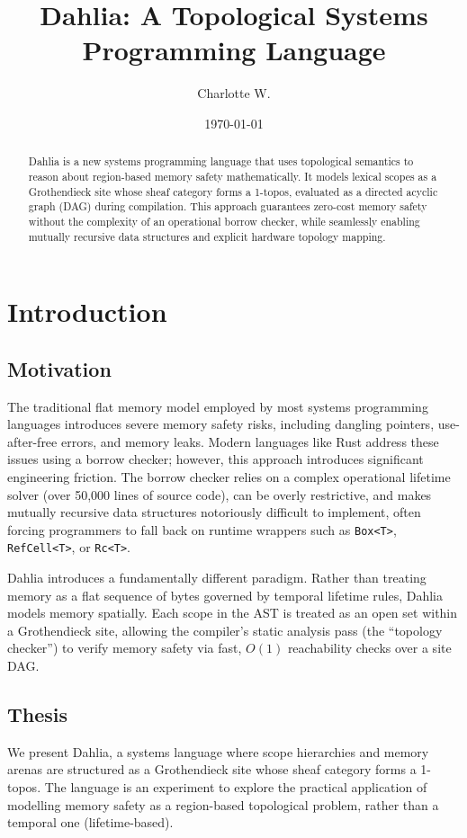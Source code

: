 \documentclass[11pt]{article}
\title{Dahlia: A Topological Systems Programming Language}
\author{Charlotte W.}
\date{\today}
\begin{document}
\maketitle
\begin{abstract}
    Dahlia is a new systems programming language that uses topological semantics to reason about region-based memory safety mathematically. It models lexical scopes as a Grothendieck site whose sheaf category forms a 1-topos, evaluated as a directed acyclic graph (DAG) during compilation. This approach guarantees zero-cost memory safety without the complexity of an operational borrow checker, while seamlessly enabling mutually recursive data structures and explicit hardware topology mapping.
\end{abstract}

\tableofcontents

\pagebreak

\section{Introduction}

\subsection{Motivation}
The traditional flat memory model employed by most systems programming languages introduces severe memory safety risks, including dangling pointers, use-after-free errors, and memory leaks. Modern languages like Rust address these issues using a borrow checker; however, this approach introduces significant engineering friction. The borrow checker relies on a complex operational lifetime solver (over 50,000 lines of source code), can be overly restrictive, and makes mutually recursive data structures notoriously difficult to implement, often forcing programmers to fall back on runtime wrappers such as \texttt{Box<T>}, \texttt{RefCell<T>}, or \texttt{Rc<T>}.

Dahlia introduces a fundamentally different paradigm. Rather than treating memory as a flat sequence of bytes governed by temporal lifetime rules, Dahlia models memory spatially. Each scope in the AST is treated as an open set within a Grothendieck site, allowing the compiler's static analysis pass (the ``topology checker'') to verify memory safety via fast, $O(1)$ reachability checks over a site DAG.

\subsection{Thesis}
We present Dahlia, a systems language where scope hierarchies and memory arenas are structured as a Grothendieck site whose sheaf category forms a 1-topos.
The language is an experiment to explore the practical application of modelling memory safety as a region-based topological problem, rather than a temporal one (lifetime-based).
\end{document}
